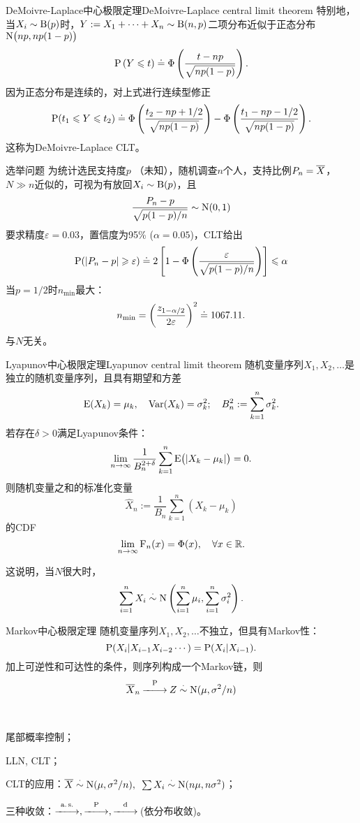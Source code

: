 \begin{example}{DeMoivre-Laplace中心极限定理}{DeMoivre-Laplace central limit theorem}
	特别地，当$X_i\sim\Bern(p)$时，$Y:=X_1+\cdots+X_n\sim\Bern(n,p)$二项分布近似于正态分布$\Norm\bigkh{np,np(1-p)}$
	\[
		\P\kh{Y\leqslant t}\doteq\Phi\kh{\frac{t-np}{\sqrt{np(1-p)}}}.
	\]
	因为正态分布是连续的，对上式进行连续型修正
	\[
		\P(t_1\leqslant Y\leqslant t_2)\doteq\Phi\kh{\frac{t_2-np+1/2}{\sqrt{np(1-p)}}}-\Phi\kh{\frac{t_1-np-1/2}{\sqrt{np(1-p)}}}.
	\]
	这称为DeMoivre-Laplace CLT。
\end{example}
\begin{example}{选举问题}{}
	为统计选民支持度$p$ （未知），随机调查$n$个人，支持比例$P_n=\avg X$，$N\gg n$近似的，可视为有放回$X_i\sim\Bern(p)$，且
	\[
		\frac{P_n-p}{\sqrt{p(1-p)/n}}\sim\Norm(0,1)
	\]
	要求精度$\varepsilon=0.03$，置信度为95\% ($\alpha=0.05$)，CLT给出
	\[
		\P(|P_n-p|\geqslant\varepsilon)\doteq 2\fkh{1-\Phi\kh{\frac\varepsilon{\sqrt{p(1-p)/n}}}}\leqslant\alpha
	\]
	当$p=1/2$时$n_{\mathrm{min}}$最大：
	\[
		n_{\mathrm{min}}=\biggkh{\frac{z_{1-\alpha/2}}{2\varepsilon}}^2\doteq 1067.11.
	\]%
	与$N$无关。
\end{example}
\begin{theorem}{Lyapunov中心极限定理}{Lyapunov central limit theorem}
	随机变量序列$X_1,X_2,\ldots$是独立的随机变量序列，且具有期望和方差
	\[
		\E(X_k)=\mu_k,\quad\Var(X_k)=\sigma_k^2;\quad B_n^2:=\sum_{k=1}^n\sigma_k^2.
	\]
	若存在$\delta>0$满足Lyapunov条件：
	\[
		\lim_{n\to\infty}\frac1{B_n^{2+\delta}}\sum_{k=1}^n\E\bigkh{|X_k-\mu_k|}=0.
	\]
	则随机变量之和的标准化变量
	\[
		\hat X_n:=\frac1{B_n}\sum_{k=1}^n(X_k-\mu_k)
	\]
	的CDF
	\[
		\lim_{n\to\infty}\CDF_n(x)=\Phi(x),\quad\forall x\in\RR.
	\]
\end{theorem}
这说明，当$N$很大时，
\begin{align}
	\sum_{i=1}^nX_i\dotsim\Norm\kh{\sum_{i=1}^n\mu_i,\sum_{i=1}^n\sigma^2_i}.
\end{align}

\begin{theorem}{Markov中心极限定理}{}
	随机变量序列$X_1,X_2,\ldots$不独立，但具有Markov性：
	\[
		\P(X_i|X_{i-1}X_{i-2}\cdots)=\P(X_i|X_{i-1}).
	\]
	加上可逆性和可达性的条件，则序列构成一个Markov链，则
	\begin{align}
		\avg X_n\pto Z\dotsim\Norm(\mu,\sigma^2/n)
	\end{align}
\end{theorem}

\begin{remark}~
	\begin{compactenum}
		\item 尾部概率控制；
		\item LLN, CLT；
		\item CLT的应用：$\avg X\dotsim\Norm(\mu,\sigma^2/n),\enspace\sum X_i\dotsim\Norm(n\mu,n\sigma^2)$；
		\item 三种收敛：$\asto,\pto,\dto$\,(依分布收敛)。
	\end{compactenum}
\end{remark}